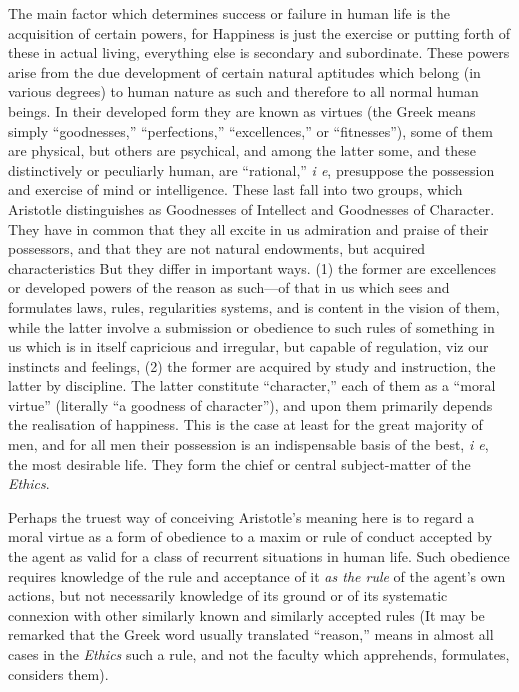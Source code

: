 The main factor which determines success or failure in human life is the
acquisition of certain powers, for Happiness is just the exercise or putting
forth of these in actual living, everything else is secondary and subordinate.
These powers arise from the due development of certain natural aptitudes which
belong (in various degrees) to human nature as such and therefore to all normal
human beings. In their developed form they are known as virtues (the Greek
means simply “goodnesses,” “perfections,”
“excellences,” or “fitnesses”), some of them are
physical, but others are psychical, and among the latter some, and these
distinctively or peculiarly human, are “rational,” \emph{i e},
presuppose the possession and exercise of mind or intelligence. These last fall
into two groups, which Aristotle distinguishes as Goodnesses of Intellect and
Goodnesses of Character. They have in common that they all excite in us
admiration and praise of their possessors, and that they are not natural
endowments, but acquired characteristics But they differ in important ways. (1)
the former are excellences or developed powers of the reason as such—of
that in us which sees and formulates laws, rules, regularities systems, and is
content in the vision of them, while the latter involve a submission or
obedience to such rules of something in us which is in itself capricious and
irregular, but capable of regulation, viz our instincts and feelings, (2) the
former are acquired by study and instruction, the latter by discipline. The
latter constitute “character,” each of them as a “moral
virtue” (literally “a goodness of character”), and upon them
primarily depends the realisation of happiness. This is the case at least for
the great majority of men, and for all men their possession is an indispensable
basis of the best, \emph{i e}, the most desirable life. They form the chief or
central subject-matter of the \emph{Ethics}.

Perhaps the truest way of conceiving Aristotle’s meaning here is to
regard a moral virtue as a form of obedience to a maxim or rule of conduct
accepted by the agent as valid for a class of recurrent situations in human
life. Such obedience requires knowledge of the rule and acceptance of it \emph{as
the rule} of the agent’s own actions, but not necessarily knowledge of
its ground or of its systematic connexion with other similarly known and
similarly accepted rules (It may be remarked that the Greek word usually
translated “reason,” means in almost all cases in the \emph{Ethics}
such a rule, and not the faculty which apprehends, formulates, considers them).

